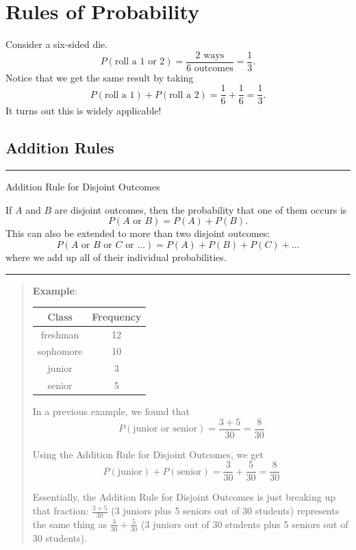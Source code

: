 \documentclass[
]{book}
\begin{document}
\section{Rules of Probability}\label{rules-of-probability}

Consider a six-sided die. \[P(\text{roll a 1 or 2}) = \frac{\text{2 ways}}{\text{6 outcomes}} = \frac{1}{3}.\] Notice that we get the same result by taking \[P(\text{roll a 1})+P(\text{roll a 2}) = \frac{1}{6}+\frac{1}{6} = \frac{1}{3}.\] It turns out this is widely applicable!

\subsection{Addition Rules}\label{addition-rules}

\begin{center}\rule{0.5\linewidth}{0.5pt}\end{center}

Addition Rule for Disjoint Outcomes

If \(A\) and \(B\) are disjoint outcomes, then the probability that one of them occurs is \[P(A\text{ or } B) = P(A)+P(B).\] This can also be extended to more than two disjoint outcomes: \[P(A \text{ or } B \text{ or } C \text{ or } \dots ) = P(A)+P(B)+P(C) + \dots\] where we add up all of their individual probabilities.

\begin{center}\rule{0.5\linewidth}{0.5pt}\end{center}

\begin{quote}
\textbf{Example}:

\begin{longtable}[]{@{}cc@{}}
\toprule\noalign{}
Class & Frequency \\
\midrule\noalign{}
\endhead
\bottomrule\noalign{}
\endlastfoot
freshman & 12 \\
sophomore & 10 \\
junior & 3 \\
senior & 5 \\
\end{longtable}

In a previous example, we found that \[P(\text{junior or senior}) = \frac{3+5}{30} = \frac{8}{30}\]

Using the Addition Rule for Disjoint Outcomes, we get \[P(\text{junior})+P(\text{senior}) = \frac{3}{30} + \frac{5}{30} = \frac{8}{30}\]

Essentially, the Addition Rule for Disjoint Outcomes is just breaking up that fraction: \(\frac{3+5}{30}\) (3 juniors plus 5 seniors out of 30 students) represents the same thing as \(\frac{3}{30} + \frac{5}{30}\) (3 juniors out of 30 students plus 5 seniors out of 30 students).
\end{quote}
\end{document}
